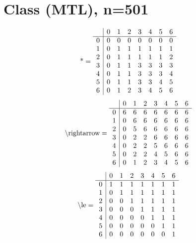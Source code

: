 \documentclass[11pt]{article}
\begin{document}
\section{Class (MTL), n=501}
\[\text{*} = 
\begin{array}{r | r r r r r r r}
 & 0 & 1 & 2 & 3 & 4 & 5 & 6 \\ \hline
0 & 0 & 0 & 0 & 0 & 0 & 0 & 0 \\
1 & 0 & 1 & 1 & 1 & 1 & 1 & 1 \\
2 & 0 & 1 & 1 & 1 & 1 & 1 & 2 \\
3 & 0 & 1 & 1 & 3 & 3 & 3 & 3 \\
4 & 0 & 1 & 1 & 3 & 3 & 3 & 4 \\
5 & 0 & 1 & 1 & 3 & 3 & 4 & 5 \\
6 & 0 & 1 & 2 & 3 & 4 & 5 & 6 \\
\end{array}
\]
\[\text{\textbackslash rightarrow} = 
\begin{array}{r | r r r r r r r}
 & 0 & 1 & 2 & 3 & 4 & 5 & 6 \\ \hline
0 & 6 & 6 & 6 & 6 & 6 & 6 & 6 \\
1 & 0 & 6 & 6 & 6 & 6 & 6 & 6 \\
2 & 0 & 5 & 6 & 6 & 6 & 6 & 6 \\
3 & 0 & 2 & 2 & 6 & 6 & 6 & 6 \\
4 & 0 & 2 & 2 & 5 & 6 & 6 & 6 \\
5 & 0 & 2 & 2 & 4 & 5 & 6 & 6 \\
6 & 0 & 1 & 2 & 3 & 4 & 5 & 6 \\
\end{array}
\]
\[\text{\textbackslash le} = 
\begin{array}{r | r r r r r r r}
 & 0 & 1 & 2 & 3 & 4 & 5 & 6 \\ \hline
0 & 1 & 1 & 1 & 1 & 1 & 1 & 1 \\
1 & 0 & 1 & 1 & 1 & 1 & 1 & 1 \\
2 & 0 & 0 & 1 & 1 & 1 & 1 & 1 \\
3 & 0 & 0 & 0 & 1 & 1 & 1 & 1 \\
4 & 0 & 0 & 0 & 0 & 1 & 1 & 1 \\
5 & 0 & 0 & 0 & 0 & 0 & 1 & 1 \\
6 & 0 & 0 & 0 & 0 & 0 & 0 & 1 \\
\end{array}
\]
\end{document}
